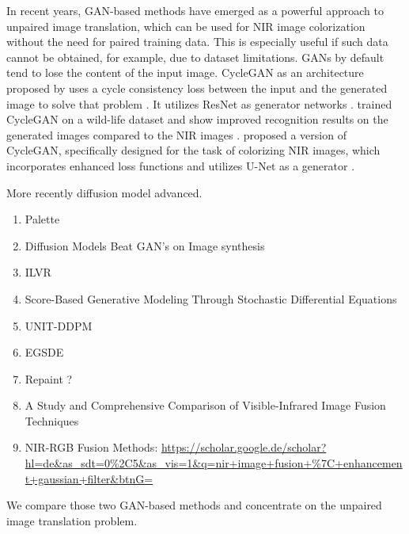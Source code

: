 In recent years, GAN-based methods have emerged as a powerful approach to unpaired image translation, which can be used for NIR image colorization without the need for paired training data.
This is especially useful if such data cannot be obtained, for example, due to dataset limitations.
GANs by default tend to lose the content of the input image. CycleGAN as an architecture proposed by  uses a cycle consistency loss between the input and the generated image to solve that problem \cite{cyclegan-original}.
It utilizes ResNet \parencite{resnet} as generator networks \parencite{cyclegan-original}.
 trained CycleGAN on a wild-life dataset and show improved recognition results on the generated images compared to the NIR images \parencite{cyclegan-camera-traps}.
 proposed a version of CycleGAN, specifically designed for the task of colorizing NIR images, which incorporates enhanced loss functions and utilizes U-Net as a generator \parencite{mehri}.

More recently diffusion model advanced.


\begin{enumerate}
    \item Palette \cite{palette}
    \item Diffusion Models Beat GAN's on Image synthesis \cite{diffusion-beats-gans}
    \item ILVR \cite{ilvr}
    \item Score-Based Generative Modeling Through Stochastic Differential Equations \cite{sbgm}
    \item UNIT-DDPM \cite{unit-ddpm}
    \item EGSDE \cite{egsde}
    \item Repaint ? \cite{repaint}
    \item A Study and Comprehensive Comparison of Visible-Infrared Image Fusion Techniques \cite{study-vis-nir-fusion}
    \item NIR-RGB Fusion Methods: \url{https://scholar.google.de/scholar?hl=de&as_sdt=0%2C5&as_vis=1&q=nir+image+fusion+%7C+enhancement+gaussian+filter&btnG=}
\end{enumerate}


We compare those two GAN-based methods and concentrate on the unpaired image translation problem.


